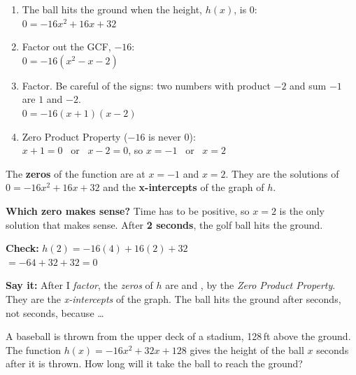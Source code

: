 \begin{minipage}[t]{0.53\textwidth}
\vspace{0pt}
\begin{enumerate}[label=\textbf{\arabic*.}, itemsep=2pt]
\item The ball hits the ground when the height, $h(x)$, is $0$:\\ $0=-16x^2+16x+32$
\item Factor out the GCF, $-16$:\\ $0=-16(x^2-x-2)$
\item Factor. Be careful of the signs: two numbers with product $-2$ and sum $-1$ are $1$ and $-2$.\\ $0=-16(x+1)(x-2)$
\item Zero Product Property ($-16$ is never $0$):\\ $x+1=0$ \ or \ $x-2=0$, so $x=-1$ \ or \ $x=2$
\end{enumerate}
\end{minipage}\hfill
\begin{minipage}[t]{0.43\textwidth}
\vspace{0pt}\raggedright
The \textbf{zeros} of the function are at $x=-1$ and $x=2$. They are the solutions of $0=-16x^2+16x+32$ and the \textbf{x-intercepts} of the graph of $h$.

\textbf{Which zero makes sense?} Time has to be positive, so $x=2$ is the only solution that makes sense. After \textbf{2 seconds}, the golf ball hits the ground.

\textbf{Check:} $h(2)=-16(4)+16(2)+32$\\ ${}=-64+32+32=0$ \checkmark
\end{minipage}

\vspace{2pt}
\textbf{Say it:} After I \emph{factor}, the \emph{zeros} of $h$ are \blank[1.2cm] and \blank[1.2cm], by the \emph{Zero Product Property}. They are the \emph{x-intercepts} of the graph. The ball hits the ground after \blank[1.2cm] seconds, not \blank[1.2cm] seconds, because \dots
\lines[2]

\newpage
{}
A baseball is thrown from the upper deck of a stadium, 128\,ft above the ground. The function $h(x)=-16x^2+32x+128$ gives the height of the ball $x$ seconds after it is thrown. How long will it take the ball to reach the ground?

